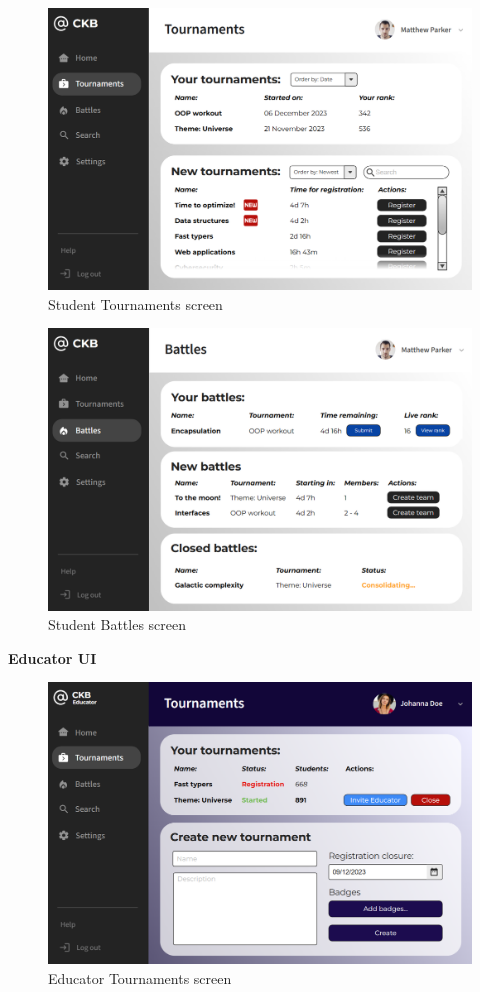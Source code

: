 \clearpage
\begin{figure}[h!]
    \centering
    \includegraphics[width=0.9\linewidth]{Images/UI_Student_Tournaments.png}
    \caption{Student Tournaments screen}
    \label{fig:enter-label}
\end{figure}

\begin{figure}[h!]
    \centering
    \includegraphics[width=0.9\linewidth]{Images/UI_Student_Battles.png}
    \caption{Student Battles screen}
    \label{fig:enter-label}
\end{figure}

\clearpage
\textbf{Educator UI}\\
\begin{figure}[h!]
    \centering
    \includegraphics[width=0.85\linewidth]{Images/UI_Educator_Tournaments.png}
    \caption{Educator Tournaments screen}
    \label{fig:enter-label}
\end{figure}

